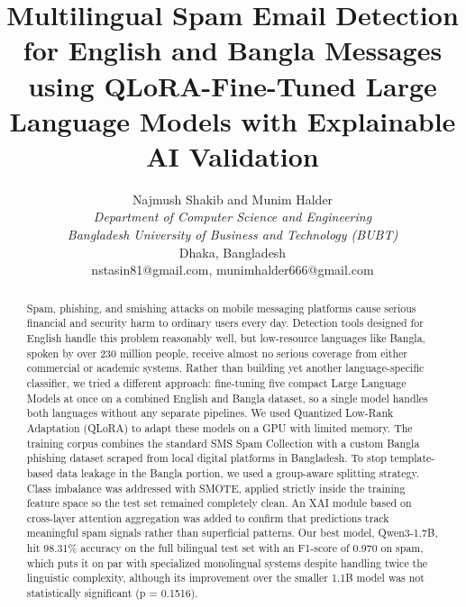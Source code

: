 \documentclass[journal]{IEEEtran}
\begin{document}
\frenchspacing

\title{Multilingual Spam Email Detection for English and Bangla Messages using QLoRA-Fine-Tuned Large Language Models with Explainable AI Validation}

\author{Najmush Shakib and Munim Halder \\
\textit{Department of Computer Science and Engineering} \\
\textit{Bangladesh University of Business and Technology (BUBT)} \\
Dhaka, Bangladesh \\
nstasin81@gmail.com, munimhalder666@gmail.com
}

\maketitle

\begin{abstract}
Spam, phishing, and smishing attacks on mobile messaging platforms cause serious financial and security harm to ordinary users every day. Detection tools designed for English handle this problem reasonably well, but low-resource languages like Bangla, spoken by over 230 million people, receive almost no serious coverage from either commercial or academic systems. Rather than building yet another language-specific classifier, we tried a different approach: fine-tuning five compact Large Language Models at once on a combined English and Bangla dataset, so a single model handles both languages without any separate pipelines. We used Quantized Low-Rank Adaptation (QLoRA) to adapt these models on a GPU with limited memory. The training corpus combines the standard SMS Spam Collection with a custom Bangla phishing dataset scraped from local digital platforms in Bangladesh. To stop template-based data leakage in the Bangla portion, we used a group-aware splitting strategy. Class imbalance was addressed with SMOTE, applied strictly inside the training feature space so the test set remained completely clean. An XAI module based on cross-layer attention aggregation was added to confirm that predictions track meaningful spam signals rather than superficial patterns. Our best model, Qwen3-1.7B, hit 98.31\% accuracy on the full bilingual test set with an F1-score of 0.970 on spam, which puts it on par with specialized monolingual systems despite handling twice the linguistic complexity, although its improvement over the smaller 1.1B model was not statistically significant (p = 0.1516).
\end{abstract}
\end{document}
